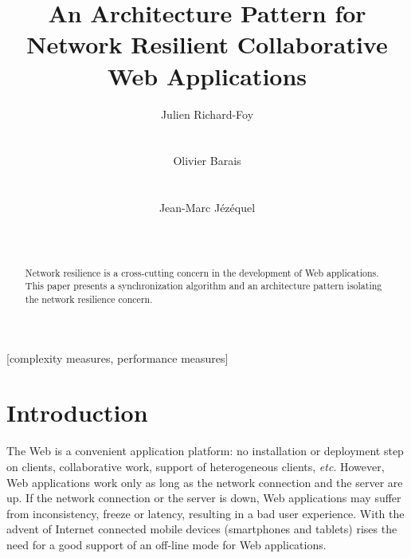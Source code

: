 \documentclass{acm_proc_article-sp}
\begin{document}
\title{An Architecture Pattern for Network Resilient Collaborative Web Applications}

\author{
\alignauthor
Julien Richard-Foy\\
       \\
       \\
\alignauthor
Olivier Barais\\
       \\
       \\
\alignauthor Jean-Marc Jézéquel\\
       \\
       \\
}

\maketitle
\begin{abstract}
Network resilience is a cross-cutting concern in the development of Web applications. This paper presents a synchronization algorithm and an architecture pattern isolating the network resilience concern.
\end{abstract}

[complexity measures, performance measures]



\section{Introduction}

The Web is a convenient application platform: no installation or deployment step on clients, collaborative work, support of heterogeneous clients, \textit{etc}. However, Web applications work only as long as the network connection and the server are up. If the network connection or the server is down, Web applications may suffer from inconsistency, freeze or latency, resulting in a bad user experience. With the advent of Internet connected mobile devices (smartphones and tablets) rises the need for a good support of an off-line mode for Web applications.
\end{document}
